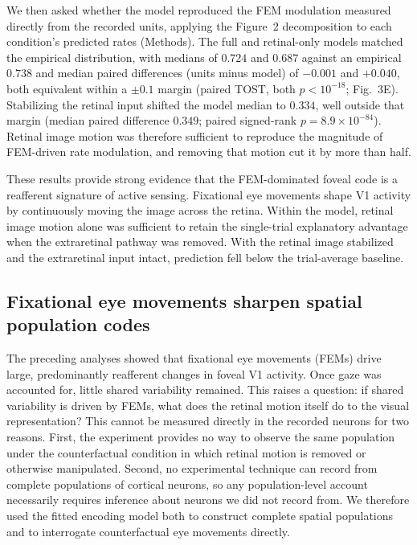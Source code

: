 \documentclass{lite}
\begin{document}
We then asked whether the model reproduced the FEM modulation measured directly from the recorded units, applying the Figure~2 decomposition to each condition's predicted rates (Methods). The full and retinal-only models matched the empirical distribution, with medians of $0.724$ and $0.687$ against an empirical $0.738$ and median paired differences (units minus model) of $-0.001$ and $+0.040$, both equivalent within a $\pm0.1$ margin (paired TOST, both $p < 10^{-18}$; Fig.~3E). Stabilizing the retinal input shifted the model median to $0.334$, well outside that margin (median paired difference $0.349$; paired signed-rank $p = 8.9\times10^{-84}$). Retinal image motion was therefore sufficient to reproduce the magnitude of FEM-driven rate modulation, and removing that motion cut it by more than half.

These results provide strong evidence that the FEM-dominated foveal code is a reafferent signature of active sensing. Fixational eye movements shape V1 activity by continuously moving the image across the retina. Within the model, retinal image motion alone was sufficient to retain the single-trial explanatory advantage when the extraretinal pathway was removed. With the retinal image stabilized and the extraretinal input intact, prediction fell below the trial-average baseline.


\subsection{Fixational eye movements sharpen spatial population codes}

The preceding analyses showed that fixational eye movements (FEMs) drive large, predominantly reafferent changes in foveal V1 activity. Once gaze was accounted for, little shared variability remained. This raises a question: if shared variability is driven by FEMs, what does the retinal motion itself do to the visual representation? This cannot be measured directly in the recorded neurons for two reasons. First, the experiment provides no way to observe the same population under the counterfactual condition in which retinal motion is removed or otherwise manipulated. Second, no experimental technique can record from complete populations of cortical neurons, so any population-level account necessarily requires inference about neurons we did not record from. We therefore used the fitted encoding model both to construct complete spatial populations and to interrogate counterfactual eye movements directly. 
\end{document}

